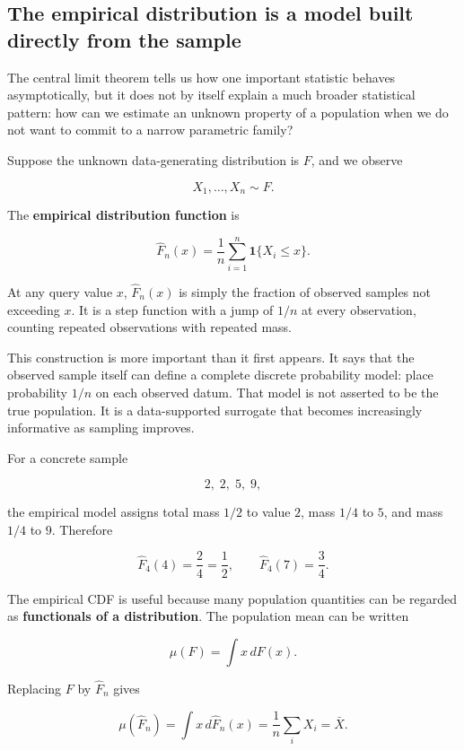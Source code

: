 \subsection{The empirical distribution is a model built directly from the sample}\label{02-foundations-ii-ch030-the-empirical-distribution-is-a-model-built-directly-from-the-sample}

The central limit theorem tells us how one important statistic behaves asymptotically, but it does not by itself explain a much broader statistical pattern: how can we estimate an unknown property of a population when we do not want to commit to a narrow parametric family?

Suppose the unknown data-generating distribution is \(F\), and we observe

\[
X_1,\ldots,X_n\sim F.
\]

The \textbf{empirical distribution function} is

\[
\boxed{
\widehat F_n(x)
=
\frac{1}{n}
\sum_{i=1}^{n}
\mathbf 1\{X_i\le x\}
}.
\]

At any query value \(x\), \(\widehat F_n(x)\) is simply the fraction of observed samples not exceeding \(x\). It is a step function with a jump of \(1/n\) at every observation, counting repeated observations with repeated mass.

This construction is more important than it first appears. It says that the observed sample itself can define a complete discrete probability model: place probability \(1/n\) on each observed datum. That model is not asserted to be the true population. It is a data-supported surrogate that becomes increasingly informative as sampling improves.

For a concrete sample

\[
2,\;2,\;5,\;9,
\]

the empirical model assigns total mass \(1/2\) to value \(2\), mass \(1/4\) to \(5\), and mass \(1/4\) to \(9\). Therefore

\[
\widehat F_4(4)=\frac{2}{4}=\frac12,
\qquad
\widehat F_4(7)=\frac{3}{4}.
\]

The empirical CDF is useful because many population quantities can be regarded as \textbf{functionals of a distribution}. The population mean can be written

\[
\mu(F)=\int x\,dF(x).
\]

Replacing \(F\) by \(\widehat F_n\) gives

\[
\mu(\widehat F_n)
=
\int x\,d\widehat F_n(x)
=
\frac1n\sum_iX_i
=
\bar X.
\]

